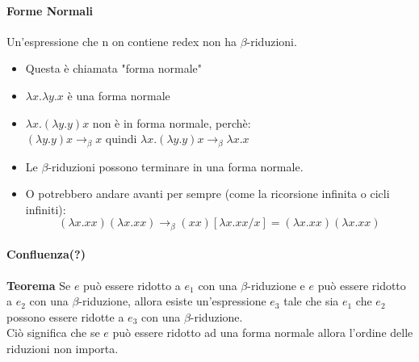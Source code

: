 \documentclass[a4paper,12pt]{article}
\begin{document}
\paragraph{Forme Normali\\}
Un'espressione che n on contiene redex non ha $\beta$-riduzioni.
\begin{itemize}
	\item Questa è chiamata "forma normale"
	\item $\lambda x.\lambda y.x$ è una forma normale
	\item $\lambda x.(\lambda y.y)x$ non è in forma normale, perchè:\\
		$(\lambda y.y)x \rightarrow_{\beta} x$ quindi $\lambda x.(\lambda y.y)x \rightarrow_{\beta} \lambda x.x$
	\item Le $\beta$-riduzioni possono terminare in una forma normale.
	\item O potrebbero andare avanti per sempre (come la ricorsione infinita o cicli infiniti):
		\[ (\lambda x.xx)(\lambda x.xx) \rightarrow_{\beta} (xx)[\lambda x.xx / x] = (\lambda x.xx)(\lambda x.xx) \]
\end{itemize}

\paragraph{Confluenza(?)\\}
\textbf{Teorema} Se $e$ può essere ridotto a $e_{1}$ con una $\beta$-riduzione e $e$ può essere ridotto a $e_{2}$ con una $\beta$-riduzione, allora esiste un'espressione $e_{3}$ tale che sia $e_{1}$ che $e_{2}$ possono essere ridotte a $e_{3}$ con una $\beta$-riduzione.\\
Ciò significa che se $e$ può essere ridotto ad una forma normale allora l'ordine delle riduzioni non importa.
\end{document}
